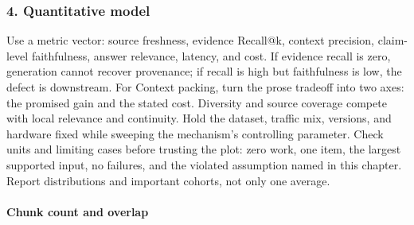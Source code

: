 \subsubsection*{4. Quantitative model}
Use a metric vector: source freshness, evidence Recall@k, context precision, claim-level faithfulness, answer relevance, latency, and cost. If evidence recall is zero, generation cannot recover provenance; if recall is high but faithfulness is low, the defect is downstream.
For Context packing, turn the prose tradeoff into two axes: the promised gain and the stated cost. Diversity and source coverage compete with local relevance and continuity. Hold the dataset, traffic mix, versions, and hardware fixed while sweeping the mechanism's controlling parameter.
Check units and limiting cases before trusting the plot: zero work, one item, the largest supported input, no failures, and the violated assumption named in this chapter. Report distributions and important cohorts, not only one average.
\paragraph{Chunk count and overlap}
